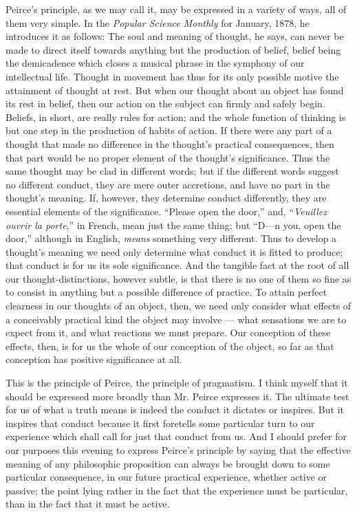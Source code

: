 \documentclass[12pt]{article}
\begin{document}
Peirce's principle, as we may call it, may be expressed in a variety of ways, all of them very simple. In the \emph{Popular Science Monthly} for January, 1878, he introduces it as follows: The soul and meaning of thought, he says, can never be made to direct itself towards anything but the production of belief, belief being the demicadence which closes a musical phrase in the symphony of our intellectual life. Thought in movement has thus for its only possible motive the attainment of thought at rest. But when our thought about an object has found its rest in belief, then our action on the subject can firmly and safely begin. Beliefs, in short, are really rules for action; and the whole function of thinking is but one step in the production of habits of action. If there were any part of a thought that made no difference in the thought's practical consequences, then that part would be no proper element of the thought's significance. Thus the same thought may be clad in different words; but if the different words suggest no different conduct, they are mere outer accretions, and have no part in the thought's meaning. If, however, they determine conduct differently, they are essential elements of the significance. ``Please open the door,'' and, ``\emph{Veuillez ouvrir la porte},'' in French, mean just the same thing; but ``D---n you, open the door,'' although in English, \emph{means} something very different. Thus to develop a thought's meaning we need only determine what conduct it is fitted to produce; that conduct is for us its sole significance. And the tangible fact at the root of all our thought-distinctions, however subtle, is that there is no one of them so fine as to consist in anything but a possible difference of practice. To attain perfect clearness in our thoughts of an object, then, we need only consider what effects of a conceivably practical kind the object may involve --- what sensations we are to expect from it, and what reactions we must prepare. Our conception of these effects, then, is for us the whole of our conception of the object, so far as that conception has positive significance at all. 

This is the principle of Peirce, the principle of pragmatism. I think myself that it should be expressed more broadly  than Mr. Peirce expresses it. The ultimate test for us of what a truth means is indeed the conduct it dictates or inspires. But it inspires that conduct because it first foretells some particular turn to our experience which shall call for just that conduct from us. And I should prefer for our purposes this evening to express Peirce's principle by saying that the effective meaning of any philosophic proposition can always be brought down to some particular consequence, in our future practical experience, whether active or passive; the point lying rather in the fact that the experience must be particular, than in the fact that it must be active. 
\end{document}
